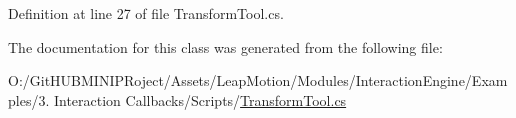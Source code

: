 Definition at line 27 of file Transform\+Tool.\+cs.



The documentation for this class was generated from the following file\+:\begin{DoxyCompactItemize}
\item 
O\+:/\+Git\+H\+U\+B\+M\+I\+N\+I\+P\+Roject/\+Assets/\+Leap\+Motion/\+Modules/\+Interaction\+Engine/\+Examples/3. Interaction Callbacks/\+Scripts/\mbox{\hyperlink{_transform_tool_8cs}{Transform\+Tool.\+cs}}\end{DoxyCompactItemize}

